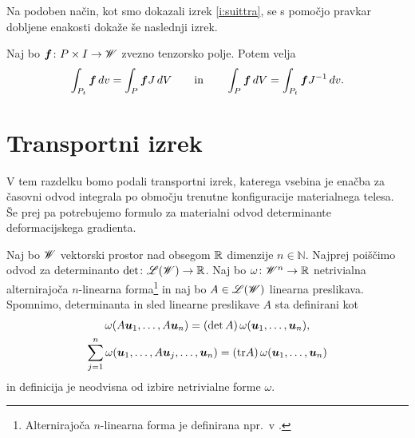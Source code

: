 Na podoben način, kot smo dokazali izrek \ref{i:suittra}, se s pomočjo pravkar dobljene
enakosti dokaže še naslednji izrek.
\begin{izrek} \label{i:prointrel}
	Naj bo $\boldsymbol f\colon P\times I\to\mathscr W$ zvezno tenzorsko polje. Potem velja
	\begin{equation*}
		\int_{P_t}\boldsymbol f\,dv=\int_P\boldsymbol fJ\,dV \qquad\textrm{in}\qquad
		\int_P\boldsymbol f\,dV=\int_{P_t}\boldsymbol fJ^{-1}\,dv.
	\end{equation*}
\end{izrek}


\section{Transportni izrek}


V tem razdelku bomo podali transportni izrek, katerega vsebina je
enačba za časovni odvod integrala po območju trenutne konfiguracije materialnega telesa.
Še prej pa potrebujemo formulo za materialni odvod determinante deformacijskega gradienta.

Naj bo $\mathscr W$ vektorski prostor nad obsegom $\mathbb R$ dimenzije $n\in\mathbb{N}$.
Najprej poiščimo odvod za determinanto $\det\colon\mathscr L(\mathscr W)\to\mathbb R$.
Naj bo $\omega\colon \mathscr W^n\to\mathbb R$ netrivialna alternirajoča $n$-linearna forma\footnote{
Alternirajoča $n$-linearna forma je definirana npr.~v \cite[str.~246]{liu}.}
in naj bo $A\in\mathscr L(\mathscr W)$ linearna preslikava.
Spomnimo, determinanta in sled linearne preslikave $A$ sta definirani kot
\begin{gather*}
	\omega(A\boldsymbol u_1,\dots,A\boldsymbol u_n)=(\det A)\,\omega(\boldsymbol u_1,\dots,\boldsymbol u_n), \\
	\sum_{j=1}^n\omega(\boldsymbol u_1,\dots,A\boldsymbol u_j,\dots,\boldsymbol u_n)=(\mathrm{tr} A)\,\omega(\boldsymbol u_1,\dots,\boldsymbol u_n)
\end{gather*}
in definicija je neodvisna od izbire netrivialne forme $\omega$.

